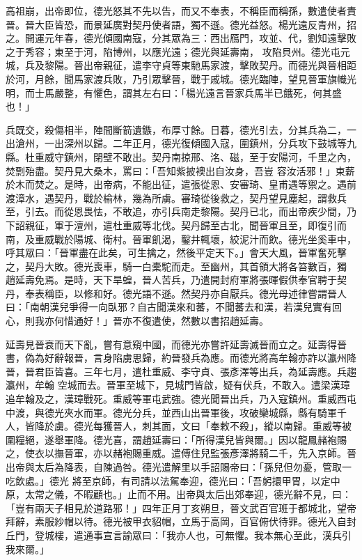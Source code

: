 \begin{pinyinscope}
 高祖崩，出帝即位，德光怒其不先以告，而又不奉表，不稱臣而稱孫，數遣使者責晉。晉大臣皆恐，而景延廣對契丹使者語，獨不遜。德光益怒。楊光遠反青州，招之。開運元年春，德光傾國南寇，分其眾為三：西出鴈門，攻並、代，劉知遠擊敗之于秀容；東至于河，陷博州，以應光遠；德光與延壽南，
 攻陷貝州。德光屯元城，兵及黎陽。晉出帝親征，遣李守貞等東馳馬家渡，擊敗契丹。而德光與晉相距於河，月餘，聞馬家渡兵敗，乃引眾擊晉，戰于戚城。德光臨陣，望見晉軍旗幟光明，而士馬嚴整，有懼色，謂其左右曰：「楊光遠言晉家兵馬半已餓死，何其盛也！」



 兵既交，殺傷相半，陣間斷箭遺鏃，布厚寸餘。日暮，德光引去，分其兵為二，一出滄州，一出深州以歸。二年正月，德光復傾國入寇，圍鎮州，分兵攻下鼓城等九縣。杜重威守鎮州，閉壁不敢出。契丹南掠邢、洺、磁，至于安陽河，千里之內，焚剽殆盡。契丹見大桑木，罵曰：「吾知紫披襖出自汝身，吾豈
 容汝活邪！」束薪於木而焚之。是時，出帝病，不能出征，遣張從恩、安審琦、皇甫遇等禦之。遇前渡漳水，遇契丹，戰於榆林，幾為所虜。審琦從後救之，契丹望見塵起，謂救兵至，引去。而從恩畏怯，不敢追，亦引兵南走黎陽。契丹已北，而出帝疾少間，乃下詔親征，軍于澶州，遣杜重威等北伐。契丹歸至古北，聞晉軍且至，即復引而南，及重威戰於陽城、衛村。晉軍飢渴，鑿井輒壞，絞泥汁而飲。德光坐奚車中，呼其眾曰：「晉軍盡在此矣，可生擒之，然後平定天下。」會天大風，晉軍奮死擊之，契丹大敗。德光喪車，騎一白橐駝而走。至幽州，其首領大將各笞數百，獨
 趙延壽免焉。是時，天下旱蝗，晉人苦兵，乃遣開封府軍將張暉假供奉官聘于契丹，奉表稱臣，以修和好。德光語不遜。然契丹亦自厭兵。德光母述律嘗謂晉人曰：「南朝漢兒爭得一向臥邪？自古聞漢來和蕃，不聞蕃去和漢，若漢兒實有回心，則我亦何惜通好！」晉亦不復遣使，然數以書招趙延壽。



 延壽見晉衰而天下亂，嘗有意窺中國，而德光亦嘗許延壽滅晉而立之。延壽得晉書，偽為好辭報晉，言身陷虜思歸，約晉發兵為應。而德光將高牟翰亦詐以瀛州降晉，晉君臣皆喜。三年七月，遣杜重威、李守貞、張彥澤等出兵，為延壽應。兵趨瀛州，牟翰
 空城而去。晉軍至城下，見城門皆啟，疑有伏兵，不敢入。遣梁漢璋追牟翰及之，漢璋戰死。重威等軍屯武強。德光聞晉出兵，乃入寇鎮州。重威西屯中渡，與德光夾水而軍。德光分兵，並西山出晉軍後，攻破欒城縣，縣有騎軍千人，皆降於虜。德光每獲晉人，刺其面，文曰「奉敕不殺」，縱以南歸。重威等被圍糧絕，遂舉軍降。德光喜，謂趙延壽曰：「所得漢兒皆與爾。」因以龍鳳赭袍賜之，使衣以撫晉軍，亦以赭袍賜重威。遣傅住兒監張彥澤將騎二千，先入京師。晉出帝與太后為降表，自陳過咎。德光遣解里以手詔賜帝曰：「孫兒但勿憂，管取一吃飲處。」德光
 將至京師，有司請以法駕奉迎，德光曰：「吾躬擐甲胃，以定中原，太常之儀，不暇顧也。」止而不用。出帝與太后出郊奉迎，德光辭不見，曰：「豈有兩天子相見於道路邪！」四年正月丁亥朔旦，晉文武百官班于都城北，望帝拜辭，素服紗帽以待。德光被甲衣貂帽，立馬于高岡，百官俯伏待罪。德光入自封丘門，登城樓，遣通事宣言諭眾曰：「我亦人也，可無懼。我本無心至此，漢兵引我來爾。」




\end{pinyinscope}
